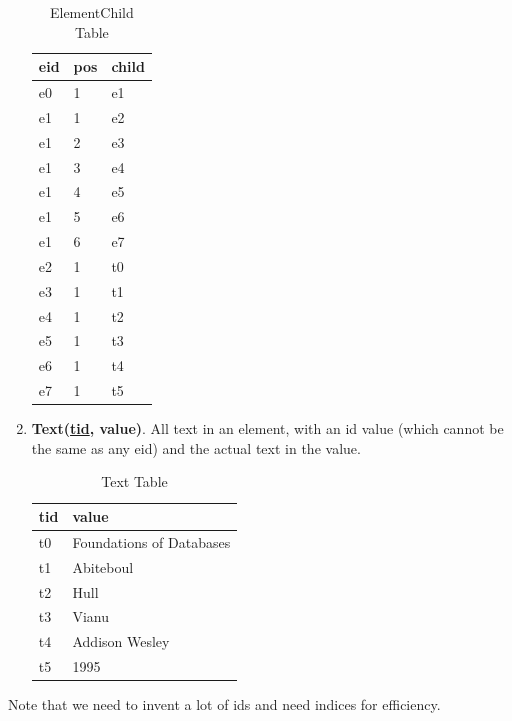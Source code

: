 \begin{enumerate}
      \begin{table}[H]
        \centering
        \caption{ElementChild Table}
        \begin{tabular}{|l|l|l|}
        \hline
        \textbf{eid} & \textbf{pos} & \textbf{child} \\
        \hline
          e0 & 1 & e1 \\
          e1 & 1 & e2 \\
          e1 & 2 & e3 \\
          e1 & 3 & e4 \\
          e1 & 4 & e5 \\
          e1 & 5 & e6 \\
          e1 & 6 & e7 \\
          e2 & 1 & t0 \\
          e3 & 1 & t1 \\
          e4 & 1 & t2 \\
          e5 & 1 & t3 \\
          e6 & 1 & t4 \\
          e7 & 1 & t5 \\
        \hline
        \end{tabular}
      \end{table}

    \item \textbf{Text(\underline{tid}, value)}. All text in an element, with an id value (which cannot be the same as any eid) and the actual text in the value. 

      \begin{table}[H]
        \centering
        \caption{Text Table}
        \begin{tabular}{|l|l|}
        \hline
        \textbf{tid} & \textbf{value} \\
        \hline
        t0 & Foundations of Databases \\
        t1 & Abiteboul \\
        t2 & Hull \\
        t3 & Vianu \\
        t4 & Addison Wesley \\
        t5 & 1995 \\
        \hline
        \end{tabular}
      \end{table}
  \end{enumerate}
  Note that we need to invent a lot of ids and need indices for efficiency. 


